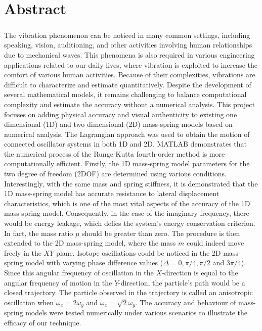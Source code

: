 \chapter*{Abstract}
\paragraph{}

The vibration phenomenon can be noticed in many common settings, including speaking, vision, auditioning, and other activities involving human relationships due to mechanical waves. This phenomena is also required in various engineering applications related to our daily lives, where vibration is exploited to increase the comfort of various human activities. Because of their complexities, vibrations are difficult to characterize and estimate quantitatively. Despite the development of several mathematical models, it remains challenging to balance computational complexity and estimate the accuracy without a numerical analysis. This project focuses on adding physical accuracy and visual authenticity to existing one dimensional (1D) and two dimensional (2D) mass-spring models based on numerical analysis. The Lagrangian approach was used to obtain the motion of connected oscillator systems in both 1D and 2D. MATLAB demonstrates that the numerical process of the Runge Kutta fourth-order method is more computationally efficient. Firstly, the 1D mass-spring model parameters for the two degree of freedom (2DOF) are determined using various conditions. Interestingly, with the same mass and spring stiffness, it is demonstrated that the 1D mass-spring model has accurate resistance to lateral displacement characteristics, which is one of the most vital aspects of the accuracy of the 1D mass-spring model. Consequently, in the case of the imaginary frequency, there would be energy leakage, which defies the system's energy conservation criterion. In fact, the mass ratio $\mu$ should be greater than zero. The procedure is then extended to the 2D mass-spring model, where the mass $m$ could indeed move freely in the $XY$ plane. Isotope oscillations could be noticed in the 2D mass-spring model with varying phase difference values ($\Delta = 0 , \pi/4 , \pi/2$  and $3\pi/4 $). Since this angular frequency of oscillation in the $X$-direction is equal to the angular frequency of motion in the $Y$-direction, the particle's path would be a closed trajectory. The particle observed in the trajectory is called an anisotropic oscillation when $\omega_x = 2\omega_y$ and $\omega_x = \sqrt{2}\omega_y$. The accuracy and behaviour of mass-spring models were tested numerically under various scenarios to illustrate the efficacy of our technique.
